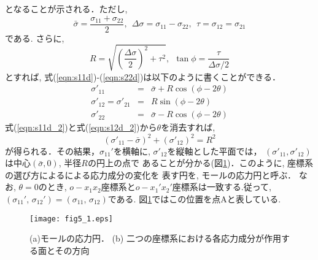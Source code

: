 \documentclass[10pt,a4j]{jarticle}
\begin{document}
となることが示される．ただし, 
\begin{equation}
	\bar \sigma = \frac{\sigma_{11}+\sigma_{22}}{2}, \ \ 
	\Delta \sigma = \sigma_{11} -\sigma_{22}, \ \ 
	\tau = \sigma_{12}=\sigma_{21}
	\label{eqn:def_sig_bar}
\end{equation}
である. さらに,
\begin{equation}
	R=\sqrt{\left(\frac{\Delta \sigma}{2}\right)^2 + \tau ^2 }, \ \ 
	\tan \phi = \frac{\tau}{\Delta\sigma /2}
	\label{eqn:def_R}
\end{equation}
とすれば, 式(\ref{eqn:s11d})-(\ref{eqn:s22d})は以下のように書くことができる．
\begin{eqnarray}
	\sigma'_{11} &=& \bar{\sigma}+R \cos \left( \phi -2\theta \right) 
		\label{eqn:s11d_2} \\
	\sigma'_{12}=\sigma'_{21} &=&  R \sin \left( \phi -2 \theta \right)
		\label{eqn:s12d_2} \\
	\sigma'_{22} &=& \bar{\sigma} - R \cos \left( \phi-2\theta \right) 
		\label{eqn:s22d_2}
\end{eqnarray}
式(\ref{eqn:s11d_2})と式(\ref{eqn:s12d_2})から$\theta$を消去すれば, 
\begin{equation}
	\left( \sigma'_{11} -\bar{\sigma}\right)^2 + \left(\sigma'_{12}\right)^2 = R^2
\end{equation}
が得られる．その結果，$\sigma_{11}'$を横軸に, $\sigma'_{12}$を縦軸とした平面では，
$(\sigma'_{11}, \sigma'_{12})$は中心$(\bar{\sigma}, 0)$, 半径$R$の円上の点で
あることが分かる(図\ref{fig:fig5_1})．このように, 座標系の選び方によるによる応力成分の変化を
表す円を, モールの応力円と呼ぶ．
なお, $\theta=0$のとき, $o-x_1x_2$座標系と$o-x_1'x_2'$座標系は一致する.従って, 
$(\sigma_{11}',\,\sigma_{12}')= (\sigma_{11},\,\sigma_{12})$である.
図\ref{fig:fig5_1}ではこの位置を点Aと表している.
\begin{figure}[h]
	\begin{center}
	\texttt{[image: fig5\_1.eps]} 
	\end{center}
	\caption{
		(a)モールの応力円．
	(b) 二つの座標系における各応力成分が作用する面とその方向
	} 
	\label{fig:fig5_1}
\end{figure}
\end{document}
